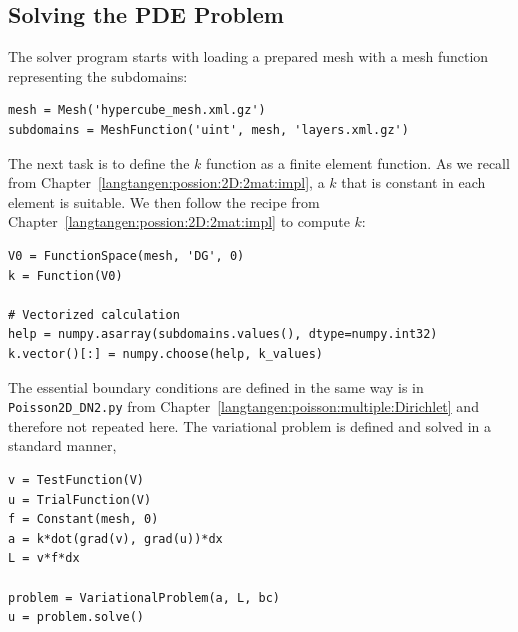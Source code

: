 \subsection{Solving the PDE Problem}
\label{langtangen:possion:nD:nmat:solve}

The solver program starts with loading a prepared mesh with a mesh
function representing the subdomains:
\begin{Verbatim}[fontsize=\fontsize{10pt}{10pt},tabsize=8,baselinestretch=1.05,
fontfamily=tt,xleftmargin=7mm]
mesh = Mesh('hypercube_mesh.xml.gz')
subdomains = MeshFunction('uint', mesh, 'layers.xml.gz')
\end{Verbatim}
\noindent

The next task is to define the $k$ function as a finite element function.
As we recall from Chapter~\ref{langtangen:possion:2D:2mat:impl}, a $k$ that
is constant in each element is suitable.
We then follow the recipe from Chapter~\ref{langtangen:possion:2D:2mat:impl}
to compute $k$:
\begin{Verbatim}[fontsize=\fontsize{10pt}{10pt},tabsize=8,baselinestretch=1.05,
fontfamily=tt,xleftmargin=7mm]
V0 = FunctionSpace(mesh, 'DG', 0)
k = Function(V0)

# Vectorized calculation
help = numpy.asarray(subdomains.values(), dtype=numpy.int32)
k.vector()[:] = numpy.choose(help, k_values)
\end{Verbatim}
\noindent

The essential boundary conditions are defined in the same way is
in {\fontsize{12pt}{12pt}\verb!Poisson2D_DN2.py!} from Chapter~\ref{langtangen:poisson:multiple:Dirichlet}
and therefore not repeated here.
The variational problem is defined and solved in a standard manner,
\begin{Verbatim}[fontsize=\fontsize{10pt}{10pt},tabsize=8,baselinestretch=1.05,
fontfamily=tt,xleftmargin=7mm]
v = TestFunction(V)
u = TrialFunction(V)
f = Constant(mesh, 0)
a = k*dot(grad(v), grad(u))*dx
L = v*f*dx

problem = VariationalProblem(a, L, bc)
u = problem.solve()
\end{Verbatim}
\noindent


